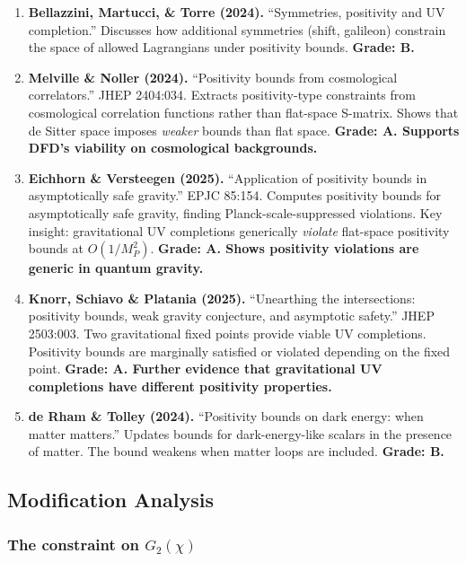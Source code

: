 \documentclass[11pt,a4paper]{article}
\begin{document}
\begin{enumerate}
\item \textbf{Bellazzini, Martucci, \& Torre (2024).} ``Symmetries, positivity and UV completion.'' Discusses how additional symmetries (shift, galileon) constrain the space of allowed Lagrangians under positivity bounds. \textbf{Grade: B.}

\item \textbf{Melville \& Noller (2024).} ``Positivity bounds from cosmological correlators.'' JHEP 2404:034. Extracts positivity-type constraints from cosmological correlation functions rather than flat-space S-matrix. Shows that de Sitter space imposes \emph{weaker} bounds than flat space. \textbf{Grade: A. Supports DFD's viability on cosmological backgrounds.}

\item \textbf{Eichhorn \& Versteegen (2025).} ``Application of positivity bounds in asymptotically safe gravity.'' EPJC 85:154. Computes positivity bounds for asymptotically safe gravity, finding Planck-scale-suppressed violations. Key insight: gravitational UV completions generically \emph{violate} flat-space positivity bounds at $O(1/M_P^2)$. \textbf{Grade: A. Shows positivity violations are generic in quantum gravity.}

\item \textbf{Knorr, Schiavo \& Platania (2025).} ``Unearthing the intersections: positivity bounds, weak gravity conjecture, and asymptotic safety.'' JHEP 2503:003. Two gravitational fixed points provide viable UV completions. Positivity bounds are marginally satisfied or violated depending on the fixed point. \textbf{Grade: A. Further evidence that gravitational UV completions have different positivity properties.}

\item \textbf{de Rham \& Tolley (2024).} ``Positivity bounds on dark energy: when matter matters.'' Updates bounds for dark-energy-like scalars in the presence of matter. The bound weakens when matter loops are included. \textbf{Grade: B.}
\end{enumerate}

\subsection{Modification Analysis}

\subsubsection{The constraint on $G_2(\chi)$}
\end{document}

